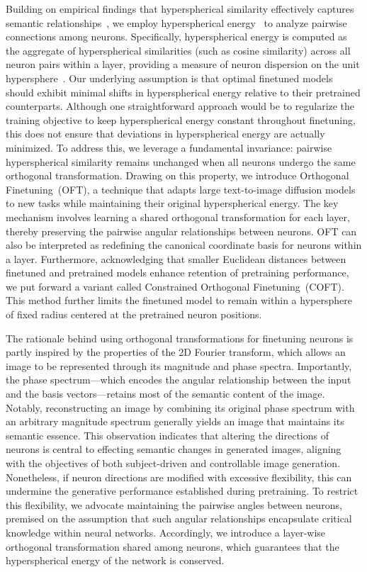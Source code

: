 Building on empirical findings that hyperspherical similarity effectively captures semantic relationships~\cite{liu2017deep,liu2018decoupled,chen2020angular}, we employ hyperspherical energy~\cite{liu2018learning} to analyze pairwise connections among neurons. Specifically, hyperspherical energy is computed as the aggregate of hyperspherical similarities (such as cosine similarity) across all neuron pairs within a layer, providing a measure of neuron dispersion on the unit hypersphere~\cite{liu2021learning}. Our underlying assumption is that optimal finetuned models should exhibit minimal shifts in hyperspherical energy relative to their pretrained counterparts. Although one straightforward approach would be to regularize the training objective to keep hyperspherical energy constant throughout finetuning, this does not ensure that deviations in hyperspherical energy are actually minimized. To address this, we leverage a fundamental invariance: pairwise hyperspherical similarity remains unchanged when all neurons undergo the same orthogonal transformation. Drawing on this property, we introduce Orthogonal Finetuning~(OFT), a technique that adapts large text-to-image diffusion models to new tasks while maintaining their original hyperspherical energy. The key mechanism involves learning a shared orthogonal transformation for each layer, thereby preserving the pairwise angular relationships between neurons. OFT can also be interpreted as redefining the canonical coordinate basis for neurons within a layer. Furthermore, acknowledging that smaller Euclidean distances between finetuned and pretrained models enhance retention of pretraining performance, we put forward a variant called Constrained Orthogonal Finetuning~(COFT). This method further limits the finetuned model to remain within a hypersphere of fixed radius centered at the pretrained neuron positions.

The rationale behind using orthogonal transformations for finetuning neurons is partly inspired by the properties of the 2D Fourier transform, which allows an image to be represented through its magnitude and phase spectra. Importantly, the phase spectrum—which encodes the angular relationship between the input and the basis vectors—retains most of the semantic content of the image. Notably, reconstructing an image by combining its original phase spectrum with an arbitrary magnitude spectrum generally yields an image that maintains its semantic essence. This observation indicates that altering the directions of neurons is central to effecting semantic changes in generated images, aligning with the objectives of both subject-driven and controllable image generation. Nonetheless, if neuron directions are modified with excessive flexibility, this can undermine the generative performance established during pretraining. To restrict this flexibility, we advocate maintaining the pairwise angles between neurons, premised on the assumption that such angular relationships encapsulate critical knowledge within neural networks. Accordingly, we introduce a layer-wise orthogonal transformation shared among neurons, which guarantees that the hyperspherical energy of the network is conserved.

